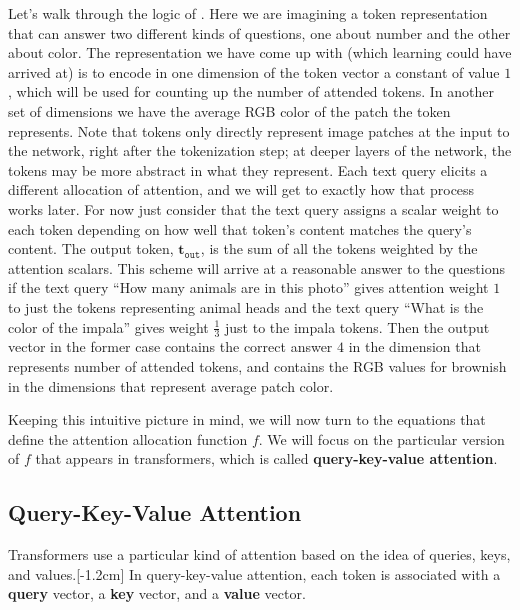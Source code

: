 Let's walk through the logic of \fig{\ref{fig:transformers:attention_layer_safari_query_cartoon}}. Here we are imagining a token representation that can answer two different kinds of questions, one about number and the other about color. The representation we have come up with (which learning could have arrived at) is to encode in one dimension of the token vector a constant of value $1$, which will be used for counting up the number of attended tokens. In another set of dimensions we have the average RGB color of the patch the token represents. Note that tokens only directly represent image patches at the input to the network, right after the tokenization step; at deeper layers of the network, the tokens may be more abstract in what they represent. Each text query elicits a different allocation of attention, and we will get to exactly how that process works later. For now just consider that the text query assigns a scalar weight to each token depending on how well that token's content matches the query's content. The output token, $\mathbf{t}_{\texttt{out}}$, is the sum of all the tokens weighted by the attention scalars. This scheme will arrive at a reasonable answer to the questions if the text query ``How many animals are in this photo'' gives attention weight $1$ to just the tokens representing animal heads and the text query ``What is the color of the impala'' gives weight $\frac{1}{3}$ just to the impala tokens. Then the output vector in the former case contains the correct answer $4$ in the dimension that represents number of attended tokens, and contains the RGB values for brownish in the dimensions that represent average patch color.


Keeping this intuitive picture in mind, we will now turn to the equations that define the attention allocation function $f$. We will focus on the particular version of $f$ that appears in transformers, which is called \textbf{query-key-value attention}.

\subsection{Query-Key-Value Attention}
Transformers use a particular kind of attention based on the idea of queries, keys, and values.[-1.2cm] In query-key-value attention, each token is associated with a \textbf{query} vector, a \textbf{key} vector, and a \textbf{value} vector. 

